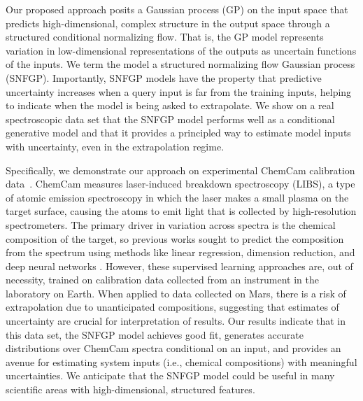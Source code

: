 \documentclass[letterpaper]{article} %
\begin{document}
Our proposed approach posits a Gaussian process (GP) on the input space that predicts high-dimensional, complex structure in the output space through a structured conditional normalizing flow.
That is, the GP model represents variation in low-dimensional representations of the outputs as uncertain functions of the inputs.
We term the model a structured normalizing flow Gaussian process (SNFGP).
Importantly, SNFGP models have the property that predictive uncertainty increases when a query input is far from the training inputs, helping to indicate when the model is being asked to extrapolate.
We show on a real spectroscopic data set that the SNFGP model performs well as a conditional generative model and that it provides a principled way to estimate model inputs with uncertainty, even in the extrapolation regime.

Specifically, we demonstrate our approach on experimental ChemCam calibration data~\cite{maurice2012chemcam}.
ChemCam measures laser-induced breakdown spectroscopy (LIBS), a type of atomic emission spectroscopy in which the laser makes a small plasma on the target surface, causing the atoms to emit light that is collected by high-resolution spectrometers.
The primary driver in variation across spectra is the chemical composition of the target, so previous works sought to predict the composition from the spectrum using methods like linear regression, dimension reduction, and deep neural networks  \cite{wiens2013pre,forni2013independent, clegg2017recalibration, anderson2017improved, castorena2021deep}.
However, these supervised learning approaches are, out of necessity, trained on calibration data collected from an instrument in the laboratory on Earth.
When applied to data collected on Mars, there is a risk of extrapolation due to unanticipated compositions, suggesting that estimates of uncertainty are crucial for interpretation of results.
Our results indicate that in this data set, the SNFGP model achieves good fit, generates accurate distributions over ChemCam spectra conditional on an input, and provides an avenue for estimating system inputs (i.e., chemical compositions) with meaningful uncertainties.
We anticipate that the SNFGP model could be useful in many scientific areas with high-dimensional, structured features.
\end{document}
